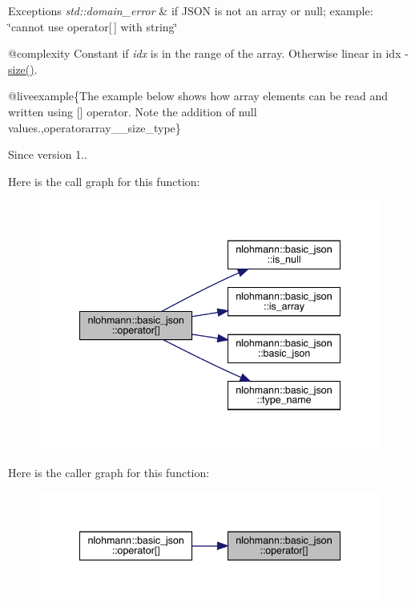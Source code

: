 \begin{DoxyExceptions}{Exceptions}
{\em std\+::domain\+\_\+error} & if J\+S\+ON is not an array or null; example\+: {\ttfamily \char`\"{}cannot use operator\mbox{[}$\,$\mbox{]} with string\char`\"{}}\\
\hline
\end{DoxyExceptions}
@complexity Constant if {\itshape idx} is in the range of the array. Otherwise linear in {\ttfamily idx -\/ \mbox{\hyperlink{classnlohmann_1_1basic__json_a25e27ad0c6d53c01871c5485e1f75b96}{size()}}}.

@liveexample\{The example below shows how array elements can be read and written using {\ttfamily \mbox{[}\mbox{]}} operator. Note the addition of {\ttfamily null} values.,operatorarray\+\_\+\+\_\+size\+\_\+type\}

\begin{DoxySince}{Since}
version 1.. 
\end{DoxySince}
Here is the call graph for this function\+:
\nopagebreak
\begin{figure}[H]
\begin{center}
\leavevmode
\includegraphics[width=341pt]{classnlohmann_1_1basic__json_ac871e3b03fb2eeca9a8de4db2bea760f_cgraph}
\end{center}
\end{figure}
Here is the caller graph for this function\+:
\nopagebreak
\begin{figure}[H]
\begin{center}
\leavevmode
\includegraphics[width=341pt]{classnlohmann_1_1basic__json_ac871e3b03fb2eeca9a8de4db2bea760f_icgraph}
\end{center}
\end{figure}
